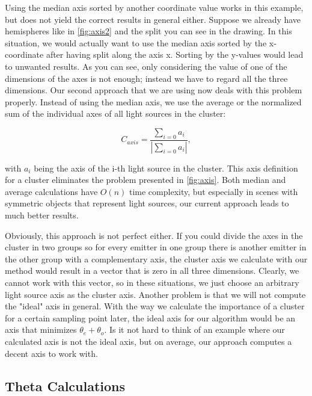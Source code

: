 Using the median axis sorted by another coordinate value works in this example, but does not yield the correct results in general either. Suppose we already have hemispheres like in \ref{fig:axis2} and the split you can see in the drawing. In this situation, we would actually want to use the median axis sorted by the x-coordinate after having split along the axis x. Sorting by the y-values would lead to unwanted results. As you can see, only considering the value of one of the dimensions of the axes is not enough; instead we have to regard all the three dimensions. Our second approach that we are using now deals with this problem properly. Instead of using the median axis, we use the average or the normalized sum of the individual axes of all light sources in the cluster:

\begin{equation}
C_{axis} = \frac{\sum_{i = 0} a_i}{|\sum_{i = 0} a_i|},
\end{equation}

with $a_i$ being the axis of the i-th light source in the cluster. This axis definition for a cluster eliminates the problem presented in \ref{fig:axis}. Both median and average calculations have $O(n)$ time complexity, but especially in scenes with symmetric objects that represent light sources, our current approach leads to much better results.

Obviously, this approach is not perfect either. If you could divide the axes in the cluster in two groups so for every emitter in one group there is another emitter in the other group with a complementary axis, the cluster axis we calculate with our method would result in a vector that is zero in all three dimensions. Clearly, we cannot work with this vector, so in these situations, we just choose an arbitrary light source axis as the cluster axis. Another problem is that we will not compute the "ideal" axis in general. With the way we calculate the importance of a cluster for a certain sampling point later, the ideal axis for our algorithm would be an axis that minimizes $\theta_e + \theta_o$. Is it not hard to think of an example where our calculated axis is not the ideal axis, but on average, our approach computes a decent axis to work with.

\subsection{Theta Calculations}
\label{subs:theta}

